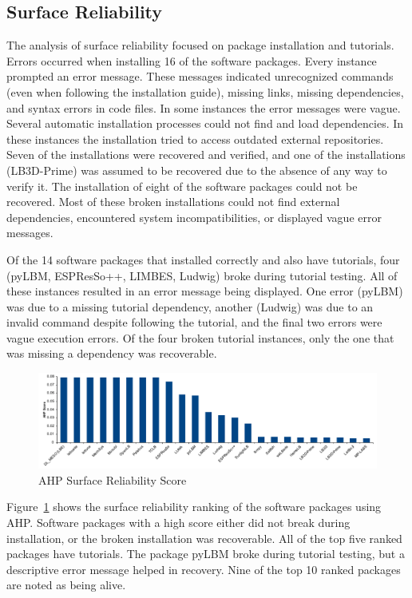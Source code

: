 \documentclass[final, 3p, times, authoryear]{elsarticle}
\begin{document}
\subsection{Surface Reliability}

The analysis of surface reliability focused on package installation and
tutorials. Errors occurred when installing 16 of the software packages. Every
instance prompted an error message. These messages indicated unrecognized
commands (even when following the installation guide), missing links, missing
dependencies, and syntax errors in code files. In some instances the error messages were vague. Several automatic installation processes could not find and load dependencies. In these instances the installation tried to access outdated external repositories. Seven of the installations were recovered and verified, and one of the installations (LB3D-Prime) was assumed to be recovered due to the absence of any way to verify it. The installation of eight of the software packages could not be recovered. Most of these broken installations could not find external dependencies, encountered system incompatibilities, or displayed vague error messages. 

Of the 14 software packages that installed correctly and also have tutorials,
four (pyLBM, ESPResSo++, LIMBES, Ludwig) broke during tutorial testing. All of
these instances resulted in an error message being displayed. One error (pyLBM)
was due to a missing tutorial dependency, another (Ludwig) was due to an invalid
command despite following the tutorial, and the final two errors were vague
execution errors. Of the four broken tutorial instances, only the one that was
missing a dependency was recoverable. 

\begin{figure}[h!]
	\begin{center}
		\includegraphics[width=1.0\textwidth]{./figures/reliability_chart.pdf}
		\caption{AHP Surface Reliability Score}
		\label{Fig_Reliability}
	\end{center}
\end{figure}

Figure~\ref{Fig_Reliability} shows the surface reliability ranking of the
software packages using AHP. Software packages with a high score either did not
break during installation, or the broken installation was recoverable. All of
the top five ranked packages have tutorials. The package pyLBM broke
during tutorial testing, but a descriptive error message helped in recovery.
Nine of the top 10 ranked packages are noted as being alive. 
\end{document}

